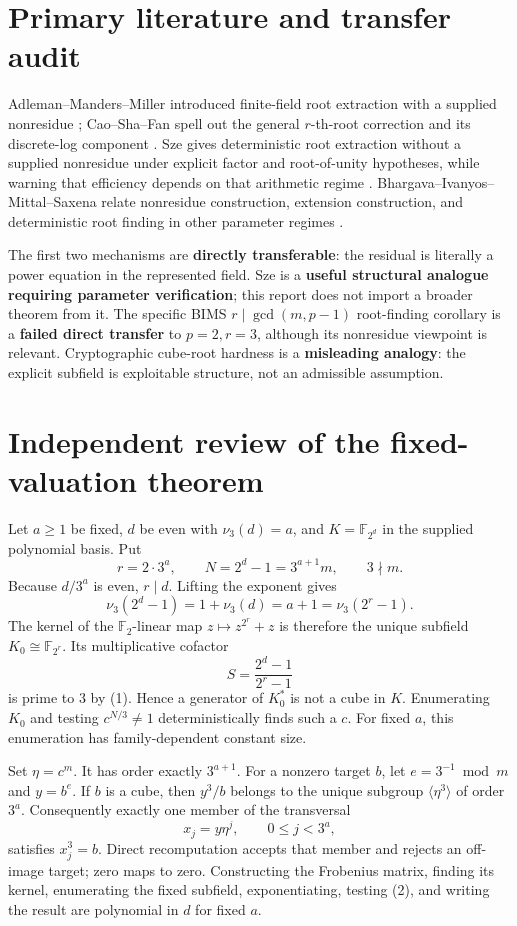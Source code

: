 \documentclass[11pt]{article}
\newcommand{\F}{\mathbb F_2}
\begin{document}
\section{Primary literature and transfer audit}
Adleman--Manders--Miller introduced finite-field root extraction with a
supplied nonresidue \cite{AMM}; Cao--Sha--Fan spell out the general
$r$-th-root correction and its discrete-log component \cite{Cao}.  Sze gives
deterministic root extraction without a supplied nonresidue under explicit
factor and root-of-unity hypotheses, while warning that efficiency depends on
that arithmetic regime \cite{Sze}.  Bhargava--Ivanyos--Mittal--Saxena relate
nonresidue construction, extension construction, and deterministic root
finding in other parameter regimes \cite{BIMS}.

The first two mechanisms are \textbf{directly transferable}: the residual is
literally a power equation in the represented field.  Sze is a
\textbf{useful structural analogue requiring parameter verification}; this
report does not import a broader theorem from it.  The specific BIMS
$r\mid\gcd(m,p-1)$ root-finding corollary is a \textbf{failed direct
transfer} to $p=2,r=3$, although its nonresidue viewpoint is relevant.
Cryptographic cube-root hardness is a \textbf{misleading analogy}: the
explicit subfield is exploitable structure, not an admissible assumption.

\section{Independent review of the fixed-valuation theorem}
Let $a\ge1$ be fixed, $d$ be even with $\nu_3(d)=a$, and
$K=\mathbb F_{2^d}$ in the supplied polynomial basis.  Put
\[
 r=2\cdot3^a,\qquad N=2^d-1=3^{a+1}m,\qquad 3\nmid m.
\]
Because $d/3^a$ is even, $r\mid d$.  Lifting the exponent gives
\[
 \nu_3(2^d-1)=1+\nu_3(d)=a+1=\nu_3(2^r-1).             \tag{1}
\]
The kernel of the $\F$-linear map $z\mapsto z^{2^r}+z$ is therefore the
unique subfield $K_0\cong\mathbb F_{2^r}$.  Its multiplicative cofactor
\[
 S=\frac{2^d-1}{2^r-1}
\]
is prime to $3$ by (1).  Hence a generator of $K_0^*$ is not a cube in $K$.
Enumerating $K_0$ and testing $c^{N/3}\ne1$ deterministically finds such a
$c$.  For fixed $a$, this enumeration has family-dependent constant size.

Set $\eta=c^m$.  It has order exactly $3^{a+1}$.  For a nonzero target $b$,
let $e=3^{-1}\bmod m$ and $y=b^e$.  If $b$ is a cube, then
$y^3/b$ belongs to the unique subgroup $\langle\eta^3\rangle$ of order
$3^a$.  Consequently exactly one member of the transversal
\[
 x_j=y\eta^j,\qquad 0\le j<3^a,                         \tag{2}
\]
satisfies $x_j^3=b$.  Direct recomputation accepts that member and rejects an
off-image target; zero maps to zero.  Constructing the Frobenius matrix,
finding its kernel, enumerating the fixed subfield, exponentiating, testing
(2), and writing the result are polynomial in $d$ for fixed $a$.
\end{document}
